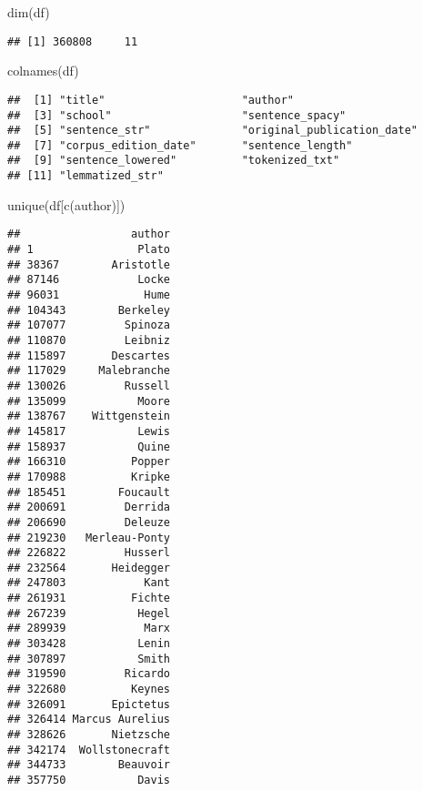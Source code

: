 \documentclass[
]{article}
\newenvironment{Shaded}{\begin{snugshade}}{\end{snugshade}}
\newcommand{\FunctionTok}[1]{\textcolor[rgb]{0.00,0.00,0.00}{#1}}
\newcommand{\NormalTok}[1]{#1}
\newcommand{\StringTok}[1]{\textcolor[rgb]{0.31,0.60,0.02}{#1}}
\begin{document}
\begin{Shaded}
\begin{Highlighting}[]
\FunctionTok{dim}\NormalTok{(df)}
\end{Highlighting}
\end{Shaded}

\begin{verbatim}
## [1] 360808     11
\end{verbatim}

\begin{Shaded}
\begin{Highlighting}[]
\FunctionTok{colnames}\NormalTok{(df)}
\end{Highlighting}
\end{Shaded}

\begin{verbatim}
##  [1] "title"                     "author"                   
##  [3] "school"                    "sentence_spacy"           
##  [5] "sentence_str"              "original_publication_date"
##  [7] "corpus_edition_date"       "sentence_length"          
##  [9] "sentence_lowered"          "tokenized_txt"            
## [11] "lemmatized_str"
\end{verbatim}

\begin{Shaded}
\begin{Highlighting}[]
\FunctionTok{unique}\NormalTok{(df[}\FunctionTok{c}\NormalTok{(}\StringTok{\textquotesingle{}author\textquotesingle{}}\NormalTok{)])}
\end{Highlighting}
\end{Shaded}

\begin{verbatim}
##                 author
## 1                Plato
## 38367        Aristotle
## 87146            Locke
## 96031             Hume
## 104343        Berkeley
## 107077         Spinoza
## 110870         Leibniz
## 115897       Descartes
## 117029     Malebranche
## 130026         Russell
## 135099           Moore
## 138767    Wittgenstein
## 145817           Lewis
## 158937           Quine
## 166310          Popper
## 170988          Kripke
## 185451        Foucault
## 200691         Derrida
## 206690         Deleuze
## 219230   Merleau-Ponty
## 226822         Husserl
## 232564       Heidegger
## 247803            Kant
## 261931          Fichte
## 267239           Hegel
## 289939            Marx
## 303428           Lenin
## 307897           Smith
## 319590         Ricardo
## 322680          Keynes
## 326091       Epictetus
## 326414 Marcus Aurelius
## 328626       Nietzsche
## 342174  Wollstonecraft
## 344733        Beauvoir
## 357750           Davis
\end{verbatim}
\end{document}
